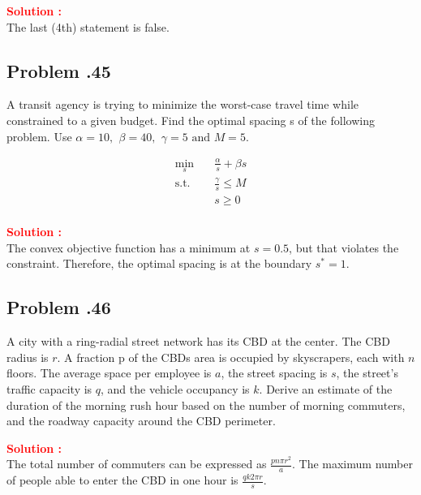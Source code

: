 \documentclass[12pt]{article}
\newcommand{\customsubsection}[1]{
  \subsection*{Problem \thesection.#1}
}
\begin{document}
\textbf{\textcolor{red}{Solution :}} \\
The last (4th) statement is false.


\newpage

\customsubsection{45}
A transit agency is trying to minimize the worst-case travel time while constrained to a given budget. Find the optimal spacing s of the following problem. Use $ \alpha=10,\,\ \beta=40,\,\ \gamma=5 \text{ and } M=5$.

\begin{equation*}
\begin{aligned}
\min_{s} \quad & \frac{\alpha}{s} + \beta s\\
\textrm{s.t.} \quad &  \frac{\gamma}{s} \leq M\\
  & s \geq 0    \\
\end{aligned}
\end{equation*}

\textbf{\textcolor{red}{Solution :}} \\
The convex objective function has a minimum at $s = 0.5$, but that violates the constraint. Therefore, the optimal spacing is at the boundary $s^*=1$. 



\newpage

\customsubsection{46}

A city with a ring-radial street network has its CBD at the center. The CBD radius is $r$. A fraction p of the CBDs area is occupied by skyscrapers, each with $n$ floors. The average space per employee is $a$, the street spacing is $s$, the street's traffic capacity is $q$, and the vehicle occupancy is $k$. Derive an estimate of the duration of the morning rush hour based on the number of morning commuters, and the roadway capacity around the CBD perimeter. 


\textbf{\textcolor{red}{Solution :}} \\
The total number of commuters can be expressed as \(\frac{pn\pi r^2}{a}\). The maximum number of people able to enter the CBD in one hour is \(\frac{qk2\pi r}{s}\).
\end{document}
